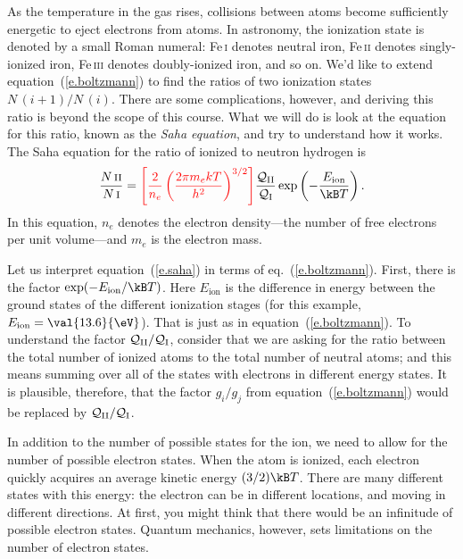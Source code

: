 As the temperature in the gas rises, collisions between atoms become sufficiently energetic to eject electrons from atoms.  In astronomy, the ionization state is denoted by a small Roman numeral: Fe\,\textsc{i} denotes neutral iron, Fe\,\textsc{ii} denotes singly-ionized iron, Fe\,\textsc{iii} denotes doubly-ionized iron, and so on. We'd like to extend equation~(\ref{e.boltzmann}) to find the ratios of two ionization states $N\,(i+1)/N\,(i)$.  There are some complications, however, and deriving this ratio is beyond the scope of this course. What we will do is look at the equation for this ratio, known as the \emph{Saha equation}, and try to understand how it works.  The Saha equation for the ratio of ionized to neutron hydrogen is
\begin{equation}\label{e.saha}
\frac{N\,\textrm{\scshape ii}}{N\,\textrm{\scshape i}} 
= {\color{red}\left[\frac{2}{n_{e}}
\left(\frac{2\pi m_{e}kT}{h^{2}}\right)^{3/2}\right]}
\frac{\pfcn_{\mathrm{II}}}{\pfcn_{\mathrm{I}}} \exp\left(-\frac{E_{\mathrm{ion}}}{\kB T}\right).
\end{equation}
In this equation, $n_{e}$ denotes the electron density---the number of free electrons per unit volume---and $m_{e}$ is the electron mass.

Let us interpret equation~(\ref{e.saha}) in terms of eq.~(\ref{e.boltzmann}).  First, there is the factor $\exp(-E_{\mathrm{ion}}/\kB T)$. Here $E_{\mathrm{ion}}$ is the difference in energy between the ground states of the different ionization stages (for this example, $E_{\mathrm{ion}} = \val{13.6}{\eV}$).  That is just as in equation~(\ref{e.boltzmann}). To understand the factor $\mathcal{Q}_{\mathrm{II}}/\mathcal{Q}_{\mathrm{I}}$, consider that we are asking for the ratio between the total number of ionized atoms to the total number of neutral atoms; and this means summing over all of the states with electrons in different energy states. It is plausible, therefore, that the factor $g_{i}/g_{j}$ from equation~(\ref{e.boltzmann}) would be replaced by $\mathcal{Q}_{\mathrm{II}}/\mathcal{Q}_{\mathrm{I}}$.

In addition to the number of possible states for the ion, we need to allow for the number of possible electron states.  When the atom is ionized, each electron quickly acquires an average kinetic energy $(3/2)\kB T$. There are many different states with this energy: the electron can be in different locations, and moving in different directions.  At first, you might think that there would be an infinitude of possible electron states.  Quantum mechanics, however, sets limitations on the number of electron states.

